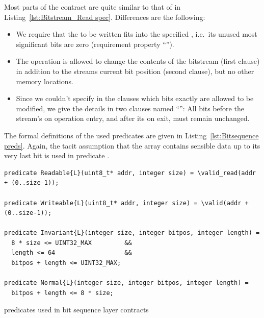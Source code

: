\FloatBarrier

Most parts of the contract are quite similar to that of
 in
Listing~\ref{lst:Bitstream_Read spec}.
%
Differences are the following:
\begin{itemize}
\item We require that the  to be written fits into
	the specified
	, i.e.\ its unused most significant bits
	are zero (requirement property
	``'').
\item The operation is allowed to change the contents of the bitstream
	(first  clause) in addition to the streams
	current bit
	position (second  clause), but no other
	memory locations.
\item Since we couldn't specify in the  clauses 
	which bits exactly are allowed to be modified, we give the
	details in two
	 clauses named ``'':
	All bits before the stream's  on operation
	entry, and after
	its  on exit, must remain unchanged.
\end{itemize}



The formal definitions of the used \acsl predicates are given in
Listing~\ref{lst:Bitsequence preds}.
%
Again, the tacit assumption that the array contains sensible data
up to its very last bit is used in predicate .



\begin{listing}[hbt]
\begin{minipage}{0.99\textwidth}
\begin{lstlisting}[style=acsl-block]
predicate Readable{L}(uint8_t* addr, integer size) = \valid_read(addr + (0..size-1));

predicate Writeable{L}(uint8_t* addr, integer size) = \valid(addr + (0..size-1));

predicate Invariant{L}(integer size, integer bitpos, integer length) =
  8 * size <= UINT32_MAX         &&
  length <= 64                   &&
  bitpos + length <= UINT32_MAX;

predicate Normal{L}(integer size, integer bitpos, integer length) =
  bitpos + length <= 8 * size;
\end{lstlisting}
\end{minipage}
\caption{\label{lst:Bitsequence preds} \acsl predicates used in bit sequence layer contracts}
\end{listing}



